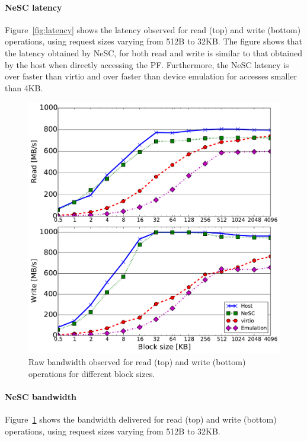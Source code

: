 \paragraph{NeSC latency}
Figure~\ref{fig:latency} shows the latency observed for read (top) and write (bottom) operations, using request sizes varying from 512B to 32KB. The figure shows that the latency obtained by NeSC, for both read and write is similar to that obtained by the host when directly accessing the PF. Furthermore, the NeSC latency is  over  faster than virtio and over  faster than device emulation for accesses smaller than 4KB.

\begin{figure}[t]
  \centering
  \includegraphics[width=1\columnwidth]{figs/throughput_block_size.pdf}
  \caption{Raw bandwidth observed for read (top) and write (bottom) operations for different block sizes.}
  \label{fig:bw}
\end{figure}

\paragraph{NeSC bandwidth}
Figure~\ref{fig:bw} shows the bandwidth delivered for read (top) and write (bottom) operations, using request sizes varying from 512B to 32KB.


